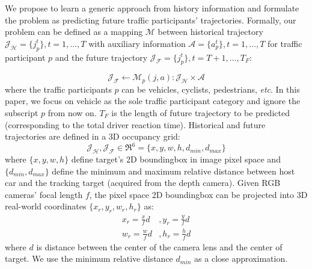 \documentclass[10pt,twocolumn,letterpaper]{article}
\begin{document}
We propose to learn a generic approach from history information and formulate the problem as predicting future traffic participants' trajectories.
Formally, our problem can be defined as a mapping $\mathcal{M}$ between historical trajectory $\mathcal{J_H}=\{j_p^t\}, t=1,\dots, T $ with auxiliary information $ \mathcal{A}=\{a_p^t\},t=1,\dots, T $ for traffic participant $p$ and the future trajectory $\mathcal{J_F}=\{j_p^t\}, t={T+1}, \ldots, T_F$:

\begin{equation}
\mathcal{J_F} \leftarrow \bm{\mathcal{M}}_p(j, a): \mathcal{J_H} \times \mathcal{A}
\label{eq:mapping}
\end{equation}
where the traffic participants $p$ can be vehicles, cyclists, pedestrians, \emph{etc}. In this paper, we focus on vehicle as the sole traffic participant category and ignore the subscript $p$ from now on. 
$T_F$ is the length of future trajectory to be predicted (corresponding to the total driver reaction time). 
Historical and future trajectories are defined in a 3D occupancy grid:
\begin{equation}
\mathcal{J_H, J_F} \in \Re^{6} =  \{x, y, w, h, d_{min}, d_{max}\}
\label{eq:mapping2}
\end{equation}
where $\{x,y,w,h\}$ define target's 2D boundingbox in image pixel space and $\{d_{min}, d_{max}\}$ define the minimum and maximum relative distance between host car and the tracking target (acquired from the depth camera). Given RGB cameras' focal length $f$, the pixel space 2D boundingbox can be projected into 3D real-world coordinates $\{x_r,y_r,w_r,h_r\}$ as:
\begin{align}
    x_r = \frac{x}{f}d &, y_r = \frac{y}{f} d  \label{eq:focal_length_1}  \\
    w_r = \frac{w}{f}d &, h_r = \frac{h}{f} d
    \label{eq:focal_length_2}
\end{align}
where $d$ is distance between  the center of the camera lens and the center of target. We use the minimum relative distance $d_{min}$ as a close approximation.

\end{document}
